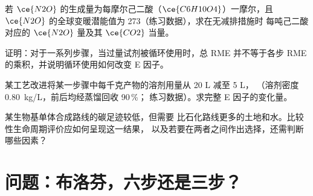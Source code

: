 \begin{exercise}[$\star\star$]\label{exo:b3:green-industrial:9}
若 $\ce{N2O}$ 的生成量为每摩尔己二酸（$\ce{C6H10O4}$）一摩尔，且
$\ce{N2O}$ 的全球变暖潜能值为 273（练习数据），求在无减排措施时
每吨己二酸对应的 $\ce{N2O}$ 量及其 $\ce{CO2}$ 当量。
\end{exercise}

\begin{exercise}[$\star\star\star$]\label{exo:b3:green-industrial:10}
证明：对于一系列步骤，当过量试剂被循环使用时，总 RME
并不等于各步 RME 的乘积，并说明循环使用如何改变
E 因子。
\end{exercise}

\begin{exercise}[$\star\star\star$]\label{exo:b3:green-industrial:11}
某工艺改进将某一步骤中每千克产物的溶剂用量从 20 L 减至 5 L，
（溶剂密度 \qty{0.80}{kg/L}，前后均经蒸馏回收 90\,\%；
练习数据）。求完整 E 因子的变化量。
\end{exercise}

\begin{exercise}[$\star\star\star$]\label{exo:b3:green-industrial:12}
某生物基单体合成路线的碳足迹较低，但需要
比石化路线更多的土地和水。比较性生命周期评价应如何呈现这一结果，
以及若要在两者之间作出选择，还需判断哪些因素？
\end{exercise}

\section{问题：布洛芬，六步还是三步？}

